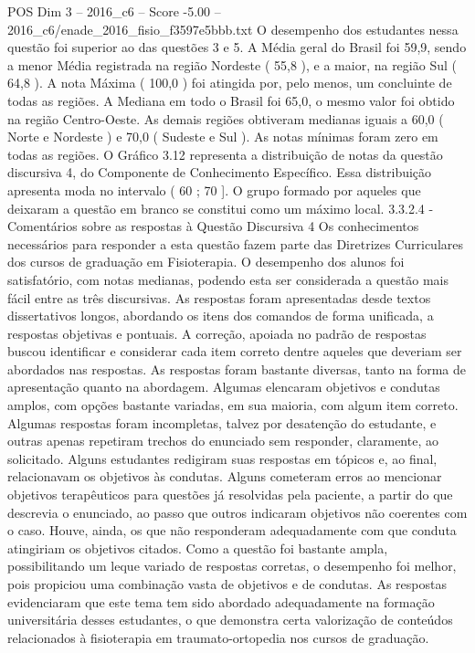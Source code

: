 \begin{textsample}{POS Dim 3 – 2016\_c6 – Score -5.00 – 2016\_c6/enade\_2016\_fisio\_f3597e5bbb.txt}
O desempenho dos estudantes nessa questão foi superior ao das questões 3 e 5.
A Média geral do Brasil foi 59,9, sendo a menor Média registrada na região Nordeste ( 55,8 ), e a maior, na região Sul ( 64,8 ).
A nota Máxima ( 100,0 ) foi atingida por, pelo menos, um concluinte de todas as regiões.
A Mediana em todo o Brasil foi 65,0, o mesmo valor foi obtido na região Centro-Oeste.
As demais regiões obtiveram medianas iguais a 60,0 ( Norte e Nordeste ) e 70,0 ( Sudeste e Sul ).
As notas mínimas foram zero em todas as regiões.
O Gráfico 3.12 representa a distribuição de notas da questão discursiva 4, do Componente de Conhecimento Específico.
Essa distribuição apresenta moda no intervalo ( 60 ; 70 ].
O grupo formado por aqueles que deixaram a questão em branco se constitui como um máximo local. 3.3.2.4 - Comentários sobre as respostas à Questão Discursiva 4 Os conhecimentos necessários para responder a esta questão fazem parte das Diretrizes Curriculares dos cursos de graduação em Fisioterapia.
O desempenho dos alunos foi satisfatório, com notas medianas, podendo esta ser considerada a questão mais fácil entre as três discursivas.
As respostas foram apresentadas desde textos dissertativos longos, abordando os itens dos comandos de forma unificada, a respostas objetivas e pontuais.
A correção, apoiada no padrão de respostas buscou identificar e considerar cada item correto dentre aqueles que deveriam ser abordados nas respostas.
As respostas foram bastante diversas, tanto na forma de apresentação quanto na abordagem.
Algumas elencaram objetivos e condutas amplos, com opções bastante variadas, em sua maioria, com algum item correto.
Algumas respostas foram incompletas, talvez por desatenção do estudante, e outras apenas repetiram trechos do enunciado sem responder, claramente, ao solicitado.
Alguns estudantes redigiram suas respostas em tópicos e, ao final, relacionavam os objetivos às condutas.
Alguns cometeram erros ao mencionar objetivos terapêuticos para questões já resolvidas pela paciente, a partir do que descrevia o enunciado, ao passo que outros indicaram objetivos não coerentes com o caso.
Houve, ainda, os que não responderam adequadamente com que conduta atingiriam os objetivos citados.
Como a questão foi bastante ampla, possibilitando um leque variado de respostas corretas, o desempenho foi melhor, pois propiciou uma combinação vasta de objetivos e de condutas.
As respostas evidenciaram que este tema tem sido abordado adequadamente na formação universitária desses estudantes, o que demonstra certa valorização de conteúdos relacionados à fisioterapia em traumato-ortopedia nos cursos de graduação.

\end{textsample}
